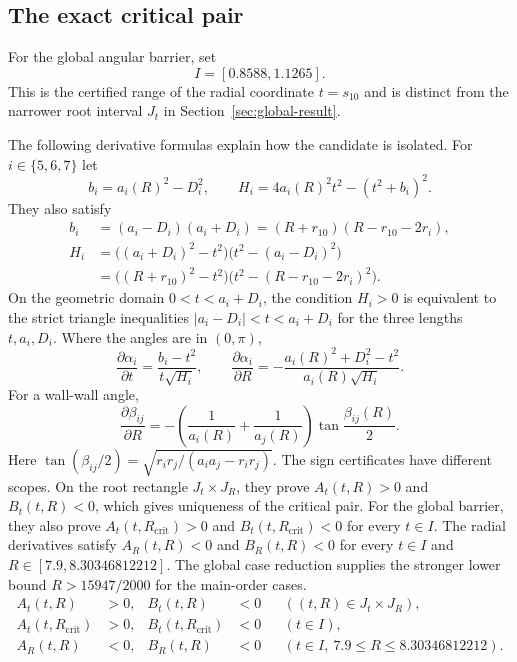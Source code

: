 \documentclass[11pt,a4paper]{article}
\theoremstyle{remark}
\newcommand{\Rcrit}{R_{\mathrm{crit}}}
\begin{document}
\subsection{The exact critical pair}

For the global angular barrier, set
\[
  I=[0.8588,1.1265].
\]
This is the certified range of the radial coordinate $t=s_{10}$ and is
distinct from the narrower root interval $J_t$ in
Section~\ref{sec:global-result}.

The following derivative formulas explain how the candidate is isolated.
For $i\in\{5,6,7\}$ let
\[
 b_i=a_i(R)^2-D_i^2,\qquad
 H_i=4a_i(R)^2t^2-(t^2+b_i)^2.
\]
They also satisfy
\begin{align}
 b_i&=(a_i-D_i)(a_i+D_i)
     =(R+r_{10})(R-r_{10}-2r_i),\\
 H_i&=\bigl((a_i+D_i)^2-t^2\bigr)
       \bigl(t^2-(a_i-D_i)^2\bigr)\\
    &=\bigl((R+r_{10})^2-t^2\bigr)
       \bigl(t^2-(R-r_{10}-2r_i)^2\bigr).
 \label{eq:factor-b-H}
\end{align}
On the geometric domain $0<t<a_i+D_i$, the condition $H_i>0$ is equivalent
to the strict triangle inequalities $|a_i-D_i|<t<a_i+D_i$ for the three
lengths $t,a_i,D_i$.
Where the angles are in $(0,\pi)$,
\begin{equation}
 \frac{\partial\alpha_i}{\partial t}
   =\frac{b_i-t^2}{t\sqrt{H_i}},\qquad
 \frac{\partial\alpha_i}{\partial R}
   =-\frac{a_i(R)^2+D_i^2-t^2}{a_i(R)\sqrt{H_i}}.
 \label{eq:alpha-derivatives}
\end{equation}
For a wall-wall angle,
\begin{equation}
 \frac{\partial\beta_{ij}}{\partial R}
  =-\left(\frac1{a_i(R)}+\frac1{a_j(R)}\right)
    \tan\frac{\beta_{ij}(R)}2.
 \label{eq:beta-derivative}
\end{equation}
Here
$\tan(\beta_{ij}/2)=\sqrt{r_ir_j/(a_i a_j-r_ir_j)}$.
The sign certificates have different scopes.  On the root rectangle
$J_t\times J_R$, they prove $A_t(t,R)>0$ and $B_t(t,R)<0$, which gives
uniqueness of the critical pair.  For the global barrier, they also prove
$A_t(t,\Rcrit)>0$ and $B_t(t,\Rcrit)<0$ for every $t\in I$.  The radial
derivatives satisfy $A_R(t,R)<0$ and $B_R(t,R)<0$ for every $t\in I$ and
$R\in[7.9,8.30346812212]$.  The global case reduction supplies the stronger
lower bound $R>15947/2000$ for the main-order cases.
\begin{equation}
\begin{aligned}
  A_t(t,R)&>0, & B_t(t,R)&<0 &&((t,R)\in J_t\times J_R),\\
  A_t(t,\Rcrit)&>0, & B_t(t,\Rcrit)&<0 &&(t\in I),\\
  A_R(t,R)&<0, & B_R(t,R)&<0
    &&(t\in I,\ 7.9\le R\le8.30346812212).
\end{aligned}
\label{eq:root-signs}
\end{equation}
\end{document}
